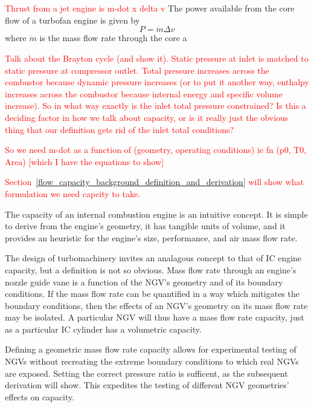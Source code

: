 \documentclass[a4paper, 11pt, twoside]{report}
\begin{document}
\textcolor{red}{Thrust from a jet engine is m-dot x delta v}
The power available from the core flow of a turbofan engine is given by
\begin{equation}
P = 
\dot{m} \Delta v
\end{equation}
where $\dot{m}$ is the mass flow rate through the core a

\textcolor{red}{Talk about the Brayton cycle (and show it). Static pressure at inlet is matched to static pressure at compressor outlet. Total pressure increases across the combustor because dynamic pressure increases (or to put it another way, enthalpy increases across the combustor because internal energy and specific volume increase). So in what way exactly is the inlet total pressure constrained? Is this a deciding factor in how we talk about capacity, or is it really just the obvious thing that our definition gets rid of the inlet total conditions?}

\textcolor{red}{So we need m-dot as a function of (geometry, operating conditions) ie fn (p0, T0, Area) [which I have the equations to show]}

\textcolor{red}{Section~\ref{flow_capacity_background_definition_and_derivation} will show what formulation we need capcity to take.}

The capacity of an internal combustion engine is an intuitive concept. It is simple to derive from the engine's geometry, it has tangible units of volume, and it provides an heuristic for the engine's size, performance, and air mass flow rate.

The design of turbomachinery invites an analagous concept to that of IC engine capacity, but a definition is not so obvious. Mass flow rate through an engine's nozzle guide vane is a function of the NGV's geometry and of its boundary conditions. If the mass flow rate can be quantified in a way which mitigates the boundary conditions, then the effects of an NGV's geometry on its mass flow rate may be isolated. A particular NGV will thus have a mass flow rate capacity, just as a particular IC cylinder has a volumetric capacity.

Defining a geometric mass flow rate capacity allows for experimental testing of NGVs without recreating the extreme boundary conditions to which real NGVs are exposed. Setting the correct pressure ratio is sufficent, as the subsequent derivation will show. This expedites the testing of different NGV geometries' effects on capacity.
\end{document}
